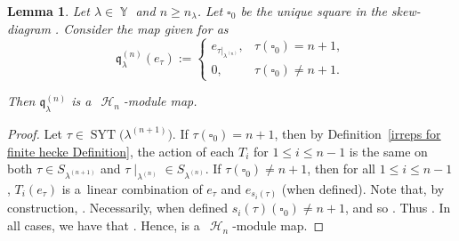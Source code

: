 \documentclass[10pt,a4paper]{amsart}
\numberwithin{equation}{section}
\newtheorem{Lemma}[Theorem]{Lemma}
\theoremstyle{definition}
\DeclareMathOperator{\Par}{\mathbb{Y}}
\DeclareMathOperator{\SYT}{\mathrm{SYT}}
\DeclareMathOperator{\sH}{\mathscr{H}}
\begin{document}
\begin{Lemma}\label{finite hecke map}
 Let $\lambda \in \Par$ and $n \geq n_{\lambda}$. Let $\square_0$ be the unique square in the skew-diagram . Consider the map  given for \smash{$\tau \in \SYT\bigl(\lambda^{(n+1)}\bigr)$} as
 \[
 \mathfrak{q}_{\lambda}^{(n)}(e_{\tau}) := \begin{cases}
 e_{\tau|_{\lambda^{(n)}}}, & \tau(\square_0) = n+1,\\
 0, & \tau(\square_0) \neq n+1.
 \end{cases}
 \]

 Then $\mathfrak{q}_{\lambda}^{(n)}$ is a~$\sH_{n}$-module map.
\end{Lemma}
\begin{proof}
Let $\tau \in \SYT\bigl(\lambda^{(n+1)}\bigr)$. If $\tau(\square_0) = n+1$, then by Definition~\ref{irreps for finite hecke Definition}, the action of each $T_i$ for $1\leq i \leq n-1$ is the same on both $\tau \in S_{\lambda^{(n+1)}}$ and $\tau\mid _{\lambda^{(n)}} \in S_{\lambda^{(n)}}$. If $\tau(\square_0) \neq n+1$, then for all $1\leq i \leq n-1$, $T_i(e_{\tau})$ is a~linear combination of $e_{\tau}$ and $e_{s_i(\tau)}$ (when defined). Note that, by construction, . Necessarily, when defined $s_i(\tau)(\square_0) \neq n+1$, and so . Thus . In all cases, we have that . Hence,  is a~$\sH_n$-module map.
\end{proof}
\end{document}
